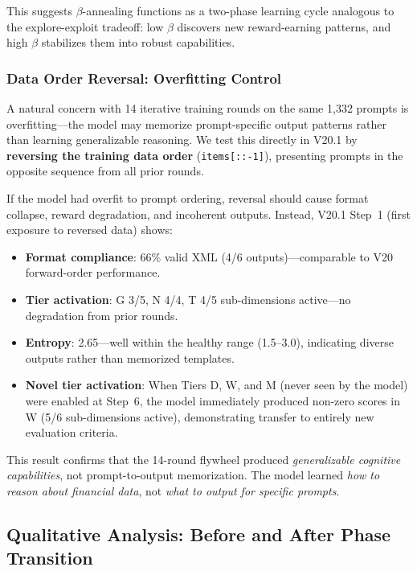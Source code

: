 \documentclass[sigconf]{acmart}
\begin{document}
This suggests $\beta$-annealing functions as a two-phase learning cycle analogous to the explore-exploit tradeoff: low $\beta$ discovers new reward-earning patterns, and high $\beta$ stabilizes them into robust capabilities.

\subsubsection{Data Order Reversal: Overfitting Control}

A natural concern with 14 iterative training rounds on the same 1{,}332 prompts is overfitting---the model may memorize prompt-specific output patterns rather than learning generalizable reasoning. We test this directly in V20.1 by \textbf{reversing the training data order} (\texttt{items[::-1]}), presenting prompts in the opposite sequence from all prior rounds.

If the model had overfit to prompt ordering, reversal should cause format collapse, reward degradation, and incoherent outputs. Instead, V20.1 Step~1 (first exposure to reversed data) shows:

\begin{itemize}
    \item \textbf{Format compliance}: 66\% valid XML (4/6 outputs)---comparable to V20 forward-order performance.
    \item \textbf{Tier activation}: G 3/5, N 4/4, T 4/5 sub-dimensions active---no degradation from prior rounds.
    \item \textbf{Entropy}: 2.65---well within the healthy range (1.5--3.0), indicating diverse outputs rather than memorized templates.
    \item \textbf{Novel tier activation}: When Tiers D, W, and M (never seen by the model) were enabled at Step~6, the model immediately produced non-zero scores in W (5/6 sub-dimensions active), demonstrating transfer to entirely new evaluation criteria.
\end{itemize}

This result confirms that the 14-round flywheel produced \textit{generalizable cognitive capabilities}, not prompt-to-output memorization. The model learned \textit{how to reason about financial data}, not \textit{what to output for specific prompts}.

\subsection{Qualitative Analysis: Before and After Phase Transition}
\end{document}
